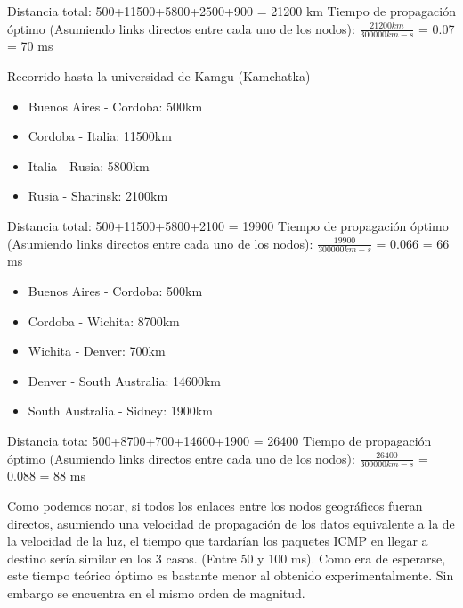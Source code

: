 Distancia total: 500+11500+5800+2500+900 = 21200 km
Tiempo de propagación óptimo (Asumiendo links directos entre cada uno de los nodos):
$\frac{21200km}{300000km-s}$ = 0.07 = 70 ms


Recorrido hasta la universidad de Kamgu (Kamchatka)

\begin{itemize}
	\item Buenos Aires - Cordoba: 500km
	\item Cordoba - Italia: 11500km
	\item Italia - Rusia: 5800km
	\item Rusia - Sharinsk:  2100km
\end{itemize}

Distancia total: 500+11500+5800+2100 = 19900
Tiempo de propagación óptimo (Asumiendo links directos entre cada uno de los nodos):
$\frac{19900}{300000km-s}$ = 0.066 = 66 ms


\begin{itemize}
	\item Buenos Aires - Cordoba: 500km
	\item Cordoba - Wichita: 8700km
	\item Wichita - Denver: 700km
	\item Denver - South Australia: 14600km
	\item South Australia - Sidney:  1900km
\end{itemize}

Distancia tota: 500+8700+700+14600+1900 = 26400
Tiempo de propagación óptimo (Asumiendo links directos entre cada uno de los nodos):
$\frac{26400}{300000km-s}$ = 0.088 = 88 ms

Como podemos notar, si todos los enlaces entre los nodos geográficos fueran directos,
asumiendo una velocidad de propagación de los datos equivalente a la de la velocidad
de la luz, el tiempo que tardarían los paquetes ICMP en llegar a destino sería similar
en los 3 casos. (Entre 50 y 100 ms). Como era de esperarse, este tiempo teórico óptimo
es bastante menor al obtenido experimentalmente. Sin embargo se encuentra en el mismo
orden de magnitud.


















